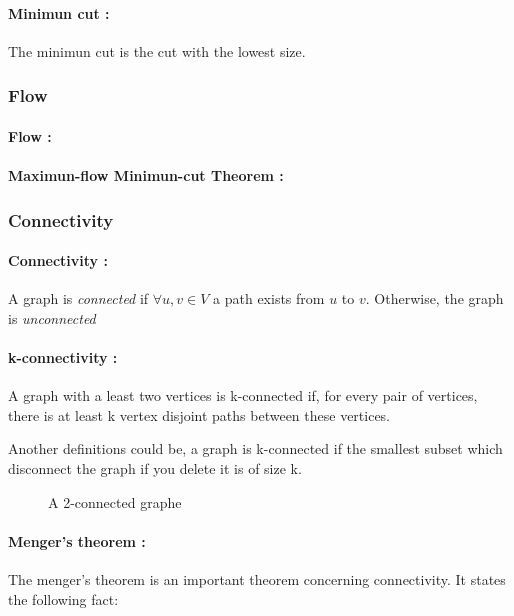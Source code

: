 \paragraph{Minimun cut :} 
The minimun cut is the cut with the lowest size. 

\subsubsection{Flow}
\paragraph{Flow :}

\paragraph{Maximun-flow Minimun-cut Theorem :}


\subsubsection{Connectivity}
\paragraph{Connectivity :}
A graph  is {\em connected} if $\forall u,v \in V$ a path exists from $u$
to $v$. Otherwise, the graph is {\em unconnected}

\paragraph{k-connectivity :}
A graph with a least two vertices is k-connected if, for every pair of vertices, there is at least k vertex disjoint paths between these vertices.

Another definitions could be, a graph is k-connected if the smallest subset which disconnect the graph if you delete it is of size k.

\begin{figure}[!h]
  \begin{center}
    
  \end{center}
  \caption{A 2-connected graphe}
\end{figure}

\paragraph{Menger's theorem :}
The menger's theorem is an important theorem concerning connectivity.
It states the following fact:

